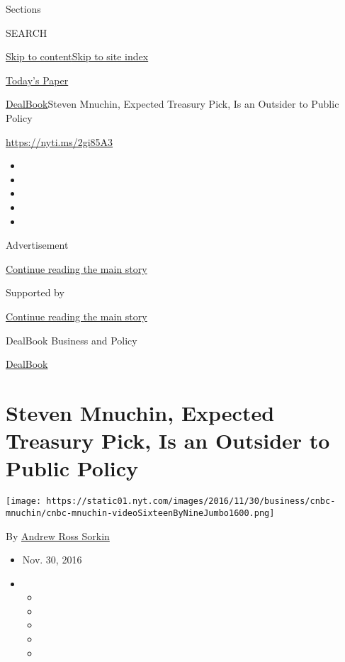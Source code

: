 Sections

SEARCH

\protect\hyperlink{site-content}{Skip to
content}\protect\hyperlink{site-index}{Skip to site index}

\href{https://myaccount.nytimes.com/auth/login?response_type=cookie\&client_id=vi}{}

\href{https://www.nytimes.com/section/todayspaper}{Today's Paper}

\href{/section/business/dealbook}{DealBook}\textbar{}Steven Mnuchin,
Expected Treasury Pick, Is an Outsider to Public Policy

\url{https://nyti.ms/2gi85A3}

\begin{itemize}
\item
\item
\item
\item
\item
\end{itemize}

Advertisement

\protect\hyperlink{after-top}{Continue reading the main story}

Supported by

\protect\hyperlink{after-sponsor}{Continue reading the main story}

DealBook Business and Policy

\href{/column/dealbook}{DealBook}

\hypertarget{steven-mnuchin-expected-treasury-pick-is-an-outsider-to-public-policy}{%
\section{Steven Mnuchin, Expected Treasury Pick, Is an Outsider to
Public
Policy}\label{steven-mnuchin-expected-treasury-pick-is-an-outsider-to-public-policy}}

\texttt{[image: https://static01.nyt.com/images/2016/11/30/business/cnbc-mnuchin/cnbc-mnuchin-videoSixteenByNineJumbo1600.png]}

By \href{http://www.nytimes.com/by/andrew-ross-sorkin}{Andrew Ross
Sorkin}

\begin{itemize}
\item
  Nov. 30, 2016
\item
  \begin{itemize}
  \item
  \item
  \item
  \item
  \item
  \end{itemize}
\end{itemize}

